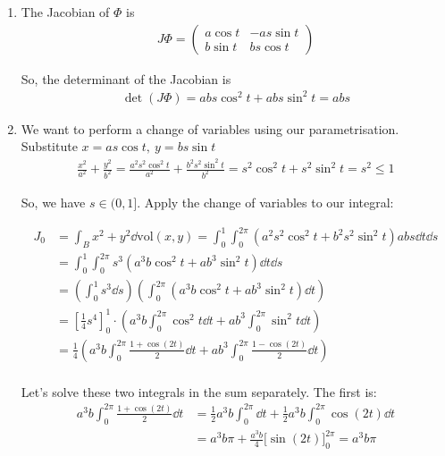 \documentclass[12pt]{article}
\begin{document}
\begin{enumerate}
    \item The Jacobian of $\Phi$ is
    \begin{align*}
        J\Phi = 
        \begin{pmatrix}
            a\cos t & -a s \sin t \\
            b \sin t & b s \cos t
        \end{pmatrix}
    \end{align*}

    So, the determinant of the Jacobian is
    \begin{align*}
        \det(J\Phi) = abs\cos^2 t + abs \sin^2 t = abs
    \end{align*}

    \item We want to perform a change of variables using our parametrisation. Substitute $x = as\cos t,\ y = b s \sin t$
    \begin{align*}
        \frac{x^2}{a^2} + \frac{y^2}{b^2} = \frac{a^2s^2\cos^2 t}{a^2} + \frac{b^2s^2\sin^2 t}{b^2} = s^2 \cos^2 t + s^2 \sin^2 t = s^2 \leq 1
    \end{align*}

    So, we have $s \in (0, 1]$. Apply the change of variables to our integral:
    
    \begin{align*}
        J_0 &= \int_B x^2 + y^2 \dd \mathrm{vol}(x, y) 
        = 
        \int_{0}^{1} \int_{0}^{2\pi} \left(a^2s^2\cos^2 t + b^2s^2\sin^2 t\right) abs \dd t \dd s \\
        &= 
        \int_{0}^{1} \int_{0}^{2\pi} s^3 \left(a^3b\cos^2 t + ab^3\sin^2 t\right) \dd t \dd s \\
        &=
        \left(\int_{0}^{1} s^3 \dd s\right) \left(\int_{0}^{2\pi}  \left(a^3b\cos^2 t + ab^3\sin^2 t\right) \dd t\right) \\
        &= \left[\frac{1}{4}s^4\right]_0^1 
        \cdot 
        \left( a^3b \int_{0}^{2\pi} \cos^2 t \dd t + ab^3 \int_{0}^{2\pi}\sin^2 t \dd t \right) \\
        &= 
        \frac{1}{4} \left( a^3b \int_{0}^{2\pi} \frac{1 + \cos(2t)}{2} \dd t + ab^3 \int_{0}^{2\pi} \frac{1 - \cos(2t)}{2} \dd t \right) \\
    \end{align*}

    Let's solve these two integrals in the sum separately. The first is:
    \begin{align*}
        a^3b \int_{0}^{2\pi} \frac{1 + \cos(2t)}{2} \dd t &= \frac{1}{2}a^3b \int_{0}^{2\pi} \dd t + \frac{1}{2}a^3b \int_{0}^{2\pi} \cos(2t) \dd t \\
        &= a^3b\pi + \frac{a^3b}{4}\big[ \sin(2t) \big]_0^{2\pi} = a^3b\pi
    \end{align*}


\end{enumerate}
\end{document}

